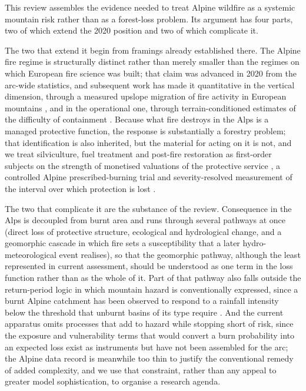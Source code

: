 \documentclass[11pt,a4paper]{article}
\begin{document}
This review assembles the evidence needed to treat Alpine wildfire as a systemic mountain risk rather than as a forest-loss problem. Its argument has four parts, two of which extend the 2020 position and two of which complicate it.

The two that extend it begin from framings already established there. The Alpine fire regime is structurally distinct rather than merely smaller than the regimes on which European fire science was built; that claim was advanced in 2020 from the arc-wide statistics, and subsequent work has made it quantitative in the vertical dimension, through a measured upslope migration of fire activity in European mountains \citep{beloiu_climatedriven_2026}, and in the operational one, through terrain-conditioned estimates of the difficulty of containment \citep{cardil_assessing_2025}. Because what fire destroys in the Alps is a managed protective function, the response is substantially a forestry problem; that identification is also inherited, but the material for acting on it is not, and we treat silviculture, fuel treatment and post-fire restoration as first-order subjects on the strength of monetised valuations of the protective service \citep{accastello_asforesee_2019, moos_climate_2021}, a controlled Alpine prescribed-burning trial \citep{gamba_prescribed_2025} and severity-resolved measurement of the interval over which protection is lost \citep{melzner_wildfire-induced_2025}.

The two that complicate it are the substance of the review. Consequence in the Alps is decoupled from burnt area and runs through several pathways at once (direct loss of protective structure, ecological and hydrological change, and a geomorphic cascade in which fire sets a susceptibility that a later hydro-meteorological event realises), so that the geomorphic pathway, although the least represented in current assessment, should be understood as one term in the loss function rather than as the whole of it. Part of that pathway also falls outside the return-period logic in which mountain hazard is conventionally expressed, since a burnt Alpine catchment has been observed to respond to a rainfall intensity below the threshold that unburnt basins of its type require \citep{laporta_postwildfire_2025}. And the current apparatus omits processes that add to hazard while stopping short of risk, since the exposure and vulnerability terms that would convert a burn probability into an expected loss exist as instruments but have not been assembled for the arc; the Alpine data record is meanwhile too thin to justify the conventional remedy of added complexity, and we use that constraint, rather than any appeal to greater model sophistication, to organise a research agenda.
\end{document}
